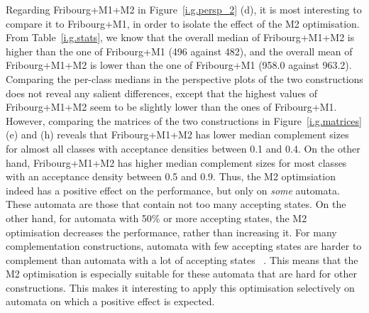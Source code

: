 Regarding Fribourg+M1+M2 in Figure~\ref{i.g.persp_2} (d), it is most interesting to compare it to Fribourg+M1, in order to isolate the effect of the M2 optimisation. From Table~\ref{i.g.stats}, we know that the overall median of Fribourg+M1+M2 is higher than the one of Fribourg+M1 (496 against 482), and the overall mean of Fribourg+M1+M2 is lower than the one of Fribourg+M1 (958.0 against 963.2). Comparing the per-class medians in the perspective plots of the two constructions does not reveal any salient differences, except that the highest values of Fribourg+M1+M2 seem to be slightly lower than the ones of Fribourg+M1. However, comparing the matrices of the two constructions in Figure~\ref{i.g.matrices} (e) and (h) reveals that Fribourg+M1+M2 has lower median complement sizes for almost all classes with acceptance densities between 0.1 and 0.4. On the other hand, Fribourg+M1+M2 has higher median complement sizes for most classes with an acceptance density between 0.5 and 0.9. Thus, the M2 optimsiation indeed has a positive effect on the performance, but only on \textit{some} automata. These automata are those that contain not too many accepting states. On the other hand, for automata with 50\% or more accepting states, the M2 optimisation decreases the performance, rather than increasing it. For many complementation constructions, automata with few accepting states are harder to complement than automata with a lot of accepting states ~\cite{2011_tsai}. This means that the M2 optimisation is especially suitable for these automata that are hard for other constructions. This makes it interesting to apply this optimisation selectively on automata on which a positive effect is expected.


